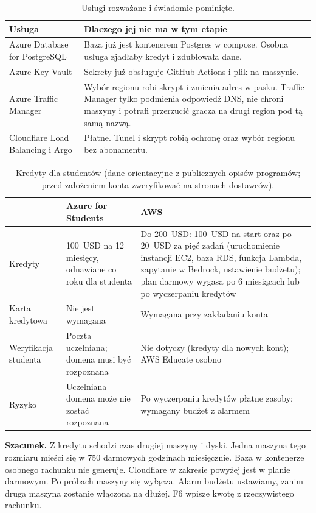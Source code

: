 \documentclass[12pt,a4paper]{article}
\begin{document}
\begin{table}[H]
\centering\footnotesize
\begin{tabularx}{\textwidth}{@{}lY@{}}
\toprule
\textbf{Usługa} & \textbf{Dlaczego jej nie ma w tym etapie} \\
\midrule
Azure Database for PostgreSQL & Baza już jest kontenerem Postgres w compose. Osobna usługa zjadłaby kredyt i zdublowała dane. \\
Azure Key Vault & Sekrety już obsługuje GitHub Actions i plik na maszynie. \\
Azure Traffic Manager & Wybór regionu robi skrypt i zmienia adres w pasku. Traffic Manager tylko podmienia odpowiedź DNS, nie chroni maszyny i potrafi przerzucić gracza na drugi region pod tą samą nazwą. \\
Cloudflare Load Balancing i Argo & Płatne. Tunel i skrypt robią ochronę oraz wybór regionu bez abonamentu. \\
\bottomrule
\end{tabularx}
\caption{Usługi rozważane i świadomie pominięte.}
\label{tab:mapa}
\end{table}

\begin{table}[H]
\centering\footnotesize
\begin{tabularx}{\textwidth}{@{}lYY@{}}
\toprule
 & \textbf{Azure for Students} & \textbf{AWS} \\
\midrule
Kredyty & 100~USD na 12 miesięcy, odnawiane co roku dla studenta & Do 200~USD: 100~USD na start oraz po 20~USD za pięć zadań (uruchomienie instancji EC2, baza RDS, funkcja Lambda, zapytanie w Bedrock, ustawienie budżetu); plan darmowy wygasa po 6 miesiącach lub po wyczerpaniu kredytów \\
Karta kredytowa & Nie jest wymagana & Wymagana przy zakładaniu konta \\
Weryfikacja studenta & Poczta uczelniana; domena musi być rozpoznana & Nie dotyczy (kredyty dla nowych kont); AWS Educate osobno \\
Ryzyko & Uczelniana domena może nie zostać rozpoznana & Po wyczerpaniu kredytów płatne zasoby; wymagany budżet z alarmem \\
\bottomrule
\end{tabularx}
\caption{Kredyty dla studentów (dane orientacyjne z publicznych opisów programów; przed założeniem konta zweryfikować na stronach dostawców).}
\end{table}

\textbf{Szacunek.} Z kredytu schodzi czas drugiej maszyny i dyski. Jedna maszyna
tego rozmiaru mieści się w 750 darmowych godzinach miesięcznie. Baza w kontenerze
osobnego rachunku nie generuje. Cloudflare w zakresie powyżej jest w planie
darmowym. Po próbach maszyny się wyłącza. Alarm budżetu ustawiamy, zanim druga
maszyna zostanie włączona na dłużej. F6 wpisze kwotę z rzeczywistego rachunku.
\end{document}
